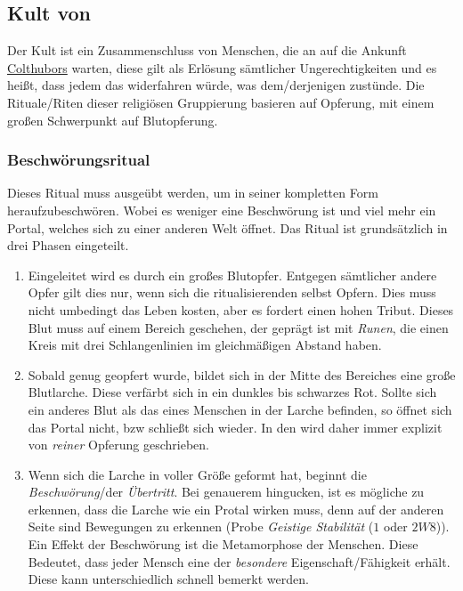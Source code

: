 \subsection{Kult von }
    \label{sons:kult-von-colthubor}
    Der Kult ist ein Zusammenschluss von Menschen, die an auf die Ankunft \hyperref[per:colthubor]{Colthubors} warten, diese gilt als Erlösung sämtlicher Ungerechtigkeiten und es heißt, dass jedem das widerfahren würde, was dem/derjenigen zustünde. Die Rituale/Riten dieser religiösen Gruppierung basieren auf Opferung, mit einem großen Schwerpunkt auf Blutopferung.

    \subsubsection{Beschwörungsritual}
        \label{sons:kult-von-colthubor:beschoerungsritual}
        Dieses Ritual muss ausgeübt werden, um  in seiner kompletten Form heraufzubeschwören. Wobei es weniger eine Beschwörung ist und viel mehr ein Portal, welches sich zu einer anderen Welt öffnet. Das Ritual ist grundsätzlich in drei Phasen eingeteilt.
        \begin{enumerate}
            \item Eingeleitet wird es durch ein großes Blutopfer. Entgegen sämtlicher andere Opfer gilt dies nur, wenn sich die ritualisierenden selbst Opfern. Dies muss nicht umbedingt das Leben kosten, aber es fordert einen hohen Tribut. Dieses Blut muss auf einem Bereich geschehen, der geprägt ist mit \emph{Runen}, die einen Kreis mit drei Schlangenlinien im gleichmäßigen Abstand haben.
            \item Sobald genug geopfert wurde, bildet sich in der Mitte des Bereiches eine große Blutlarche. Diese verfärbt sich in ein dunkles bis schwarzes Rot. Sollte sich ein anderes Blut als das eines Menschen in der Larche befinden, so öffnet sich das Portal nicht, bzw schließt sich wieder. In den  wird daher immer explizit von \emph{reiner} Opferung geschrieben.
            \item Wenn sich die Larche in voller Größe geformt hat, beginnt die \emph{Beschwörung}/der \emph{Übertritt}. Bei genauerem hingucken, ist es mögliche zu erkennen, dass die Larche wie ein Protal wirken muss, denn auf der anderen Seite sind Bewegungen zu erkennen (Probe \emph{Geistige Stabilität} ($1$ oder $2W8$)). Ein Effekt der Beschwörung ist die Metamorphose der Menschen. Diese Bedeutet, dass jeder Mensch eine der \emph{besondere} Eigenschaft/Fähigkeit erhält. Diese kann unterschiedlich schnell bemerkt werden.
        \end{enumerate}
        
